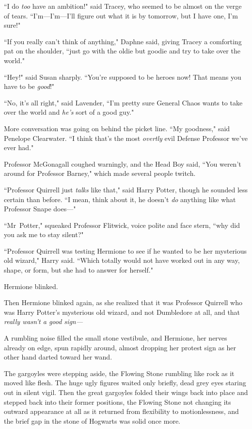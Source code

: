 ``I do \emph{too} have an ambition!" said Tracey, who seemed to be almost on the verge of tears. ``I'm—I'm—I'll figure out what it is by tomorrow, but I have one, I'm sure!"

``If you really can't think of anything," Daphne said, giving Tracey a comforting pat on the shoulder, ``just go with the oldie but goodie and try to take over the world."

``Hey!" said Susan sharply. ``You're supposed to be heroes now! That means you have to be \emph{good}!"

``No, it's all right," said Lavender, ``I'm pretty sure General Chaos wants to take over the world and \emph{he's} sort of a good guy."

More conversation was going on behind the picket line. ``My goodness," said Penelope Clearwater. ``I think that's the most \emph{overtly} evil Defense Professor we've ever had."

Professor McGonagall coughed warningly, and the Head Boy said, ``You weren't around for Professor Barney," which made several people twitch.

``Professor Quirrell just \emph{talks} like that," said Harry Potter, though he sounded less certain than before. ``I mean, think about it, he doesn't \emph{do} anything like what Professor Snape does—"

``Mr~Potter," squeaked Professor Flitwick, voice polite and face stern, ``why did you ask me to stay silent?"

``Professor Quirrell was testing Hermione to see if he wanted to be her mysterious old wizard," Harry said. ``Which totally would not have worked out in any way, shape, or form, but she had to answer for herself."

Hermione blinked.

Then Hermione blinked again, as she realized that it was Professor Quirrell who was Harry Potter's mysterious old wizard, and not Dumbledore at all, and that \emph{really wasn't a good sign—}

A rumbling noise filled the small stone vestibule, and Hermione, her nerves already on edge, spun rapidly around, almost dropping her protest sign as her other hand darted toward her wand.

The gargoyles were stepping aside, the Flowing Stone rumbling like rock as it moved like flesh. The huge ugly figures waited only briefly, dead grey eyes staring out in silent vigil. Then the great gargoyles folded their wings back into place and stepped back into their former positions, the Flowing Stone not changing its outward appearance at all as it returned from flexibility to motionlessness, and the brief gap in the stone of Hogwarts was solid once more.

